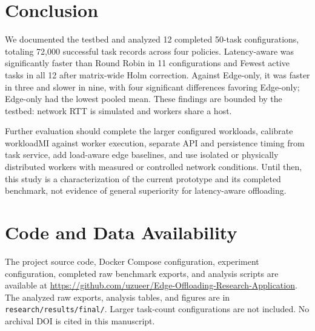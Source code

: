 \documentclass[conference]{IEEEtran}
\begin{document}
        \section{Conclusion}
        We documented the testbed and analyzed 12 completed 50-task configurations, totaling 72,000 successful task records across four policies. Latency-aware was significantly faster than Round Robin in 11 configurations and Fewest active tasks in all 12 after matrix-wide Holm correction. Against Edge-only, it was faster in three and slower in nine, with four significant differences favoring Edge-only; Edge-only had the lowest pooled mean. These findings are bounded by the testbed: network RTT is simulated and workers share a host.

        Further evaluation should complete the larger configured workloads, calibrate workloadMI against worker execution, separate API and persistence timing from task service, add load-aware edge baselines, and use isolated or physically distributed workers with measured or controlled network conditions. Until then, this study is a characterization of the current prototype and its completed benchmark, not evidence of general superiority for latency-aware offloading.

    \section*{Code and Data Availability}
    The project source code, Docker Compose configuration, experiment configuration, completed raw benchmark exports, and analysis scripts are available at \url{https://github.com/uzueer/Edge-Offloading-Research-Application}. The analyzed raw exports, analysis tables, and figures are in \texttt{research/results/final/}. Larger task-count configurations are not included. No archival DOI is cited in this manuscript.
\end{document}

